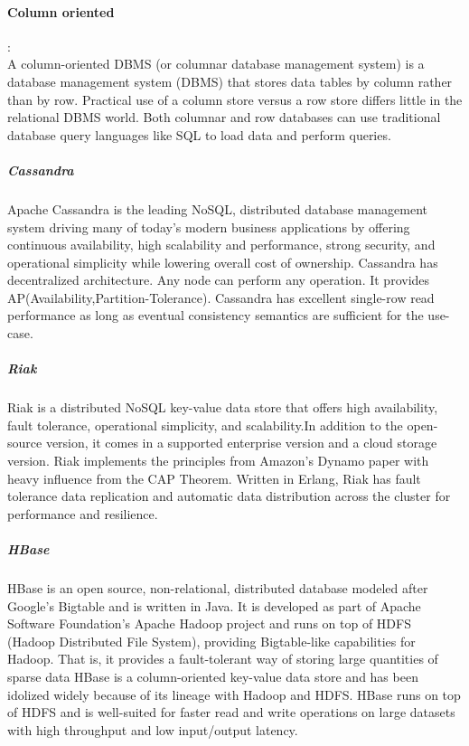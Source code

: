 \paragraph{Column oriented } :\\
\label{sec:sec01}
A column-oriented DBMS (or columnar database management system) is a database management system (DBMS) 
that stores data tables by column rather than by row. 
Practical use of a column store versus a row store differs little in the relational DBMS world. 
Both columnar and row databases can use traditional database query languages like SQL to load 
data and perform queries.
\subparagraph{Cassandra} 
\label{sec:sec01}
Apache Cassandra is the leading NoSQL, distributed database management system driving many of today's 
modern business applications by offering continuous availability, high scalability and performance, 
strong security, and operational simplicity while lowering overall cost of ownership.
Cassandra has decentralized architecture. Any node can perform any operation. It provides 
AP(Availability,Partition-Tolerance). Cassandra has excellent single-row read performance as long as 
eventual consistency semantics are sufficient for the use-case. 
\subparagraph{Riak} 
\label{sec:sec01}
Riak is a distributed NoSQL key-value data store that offers high availability, fault tolerance, operational simplicity,
 and scalability.In addition to the open-source version, it comes in a supported enterprise version and a cloud 
 storage version. Riak implements the principles from Amazon's Dynamo paper with heavy influence from the CAP 
 Theorem. Written in Erlang, Riak has fault tolerance data replication and automatic data distribution across
  the cluster for performance and resilience.
\subparagraph{HBase} 
\label{sec:sec01}
HBase is an open source, non-relational, distributed database modeled after Google's Bigtable 
and is written in Java. It is developed as part of Apache Software Foundation's Apache Hadoop project
 and runs on top of HDFS (Hadoop Distributed File System), providing Bigtable-like capabilities for Hadoop. 
 That is, it provides a fault-tolerant way of storing large quantities of sparse data
  HBase is a column-oriented key-value data store and has been idolized widely because of its 
  lineage with Hadoop and HDFS. HBase runs on top of HDFS and is well-suited for faster read and
   write operations on large datasets with high throughput and low input/output latency.
\newpage
